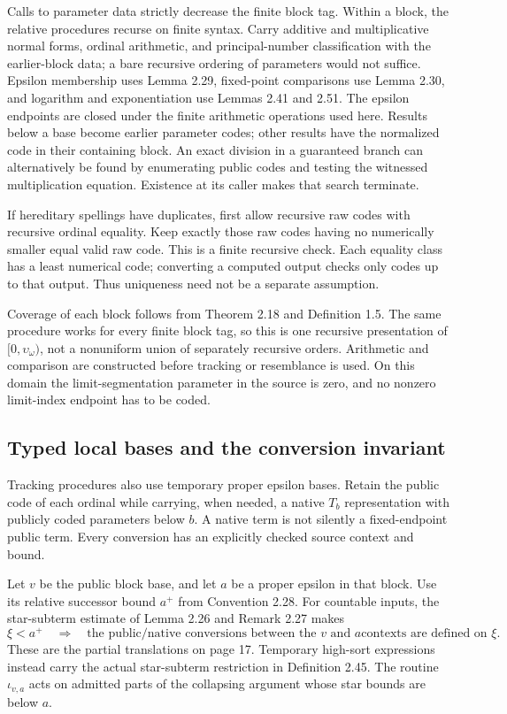 \documentclass[11pt]{article}
\newcommand{\up}{\upsilon}
\begin{document}
Calls to parameter data strictly decrease the finite block tag.
Within a block, the relative procedures recurse on finite syntax.
Carry additive and multiplicative normal forms, ordinal arithmetic,
and principal-number classification with the earlier-block data;
a bare recursive ordering of parameters would not suffice. Epsilon
membership uses Lemma 2.29, fixed-point comparisons use Lemma 2.30,
and logarithm and exponentiation use Lemmas 2.41 and 2.51. The
epsilon endpoints are closed under the finite arithmetic operations
used here. Results below a base become earlier parameter codes;
other results have the normalized code in their containing block.
An exact division in a guaranteed branch can alternatively be found
by enumerating public codes and testing the witnessed multiplication
equation. Existence at its caller makes that search terminate.

If hereditary spellings have duplicates, first allow recursive raw
codes with recursive ordinal equality. Keep exactly those raw codes
having no numerically smaller equal valid raw code. This is a finite
recursive check. Each equality class has a least numerical code;
converting a computed output checks only codes up to that output.
Thus uniqueness need not be a separate assumption.

Coverage of each block follows from Theorem 2.18 and Definition 1.5.
The same procedure works for every finite block tag, so this is one
recursive presentation of $[0,\up_\omega)$, not a nonuniform union
of separately recursive orders. Arithmetic and comparison are
constructed before tracking or resemblance is used. On this domain
the limit-segmentation parameter in the source is zero, and no
nonzero limit-index endpoint has to be coded.

\subsection{Typed local bases and the conversion invariant}

Tracking procedures also use temporary proper epsilon bases.
Retain the public code of each ordinal while carrying, when needed,
a native $T_b$ representation with publicly coded parameters below
$b$. A native term is not silently a fixed-endpoint public term.
Every conversion has an explicitly checked source context and bound.

Let $v$ be the public block base, and let $a$ be a proper epsilon
in that block. Use its relative successor bound $a^+$ from
Convention 2.28. For countable inputs, the star-subterm estimate
of Lemma 2.26 and Remark 2.27 makes
\begin{equation}\label{eq:conversion}
 \xi<a^+\quad\Longrightarrow\quad
 \text{the public/native conversions between the $v$ and $a$
 contexts are defined on $\xi$}.
\end{equation}
These are the partial translations on page 17. Temporary high-sort
expressions instead carry the actual star-subterm restriction in
Definition 2.45. The routine $\iota_{v,a}$ acts on admitted parts
of the collapsing argument whose star bounds are below $a$.
\end{document}
